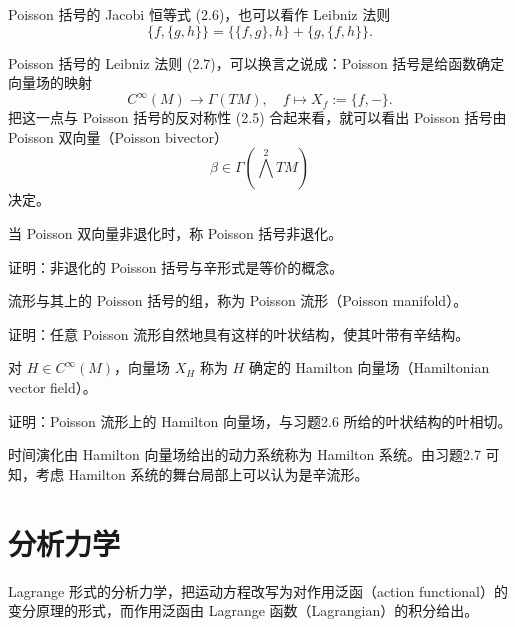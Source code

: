 \begin{remark}
Poisson 括号的 Jacobi 恒等式 (2.6)，也可以看作 Leibniz 法则
\begin{equation}
    \{f,\{g,h\}\}=\{\{f,g\},h\}+\{g,\{f,h\}\}. \tag{2.8}
\end{equation}
\end{remark}

Poisson 括号的 Leibniz 法则 (2.7)，可以换言之说成：Poisson 括号是给函数确定向量场的映射
\begin{equation}
    C^\infty(M)\to\Gamma(TM),\quad f\mapsto X_f:=\{f,-\}. \tag{2.9}
\end{equation}
把这一点与 Poisson 括号的反对称性 (2.5) 合起来看，就可以看出 Poisson 括号由 Poisson 双向量（Poisson bivector）
\begin{equation}
    \beta\in\Gamma\left(\bigwedge^2TM\right) \tag{2.10}
\end{equation}
决定。

\begin{definition}
当 Poisson 双向量非退化时，称 Poisson 括号非退化。
\end{definition}

\begin{exercise}
证明：非退化的 Poisson 括号与辛形式是等价的概念。
\end{exercise}

流形与其上的 Poisson 括号的组，称为 Poisson 流形（Poisson manifold）。

\begin{exercise}
证明：任意 Poisson 流形自然地具有这样的叶状结构，使其叶带有辛结构。
\end{exercise}

对 $H\in C^\infty(M)$，向量场 $X_H$ 称为 $H$ 确定的 Hamilton 向量场（Hamiltonian vector field）。

\begin{exercise}
证明：Poisson 流形上的 Hamilton 向量场，与习题2.6 所给的叶状结构的叶相切。
\end{exercise}

时间演化由 Hamilton 向量场给出的动力系统称为 Hamilton 系统。由习题2.7 可知，考虑 Hamilton 系统的舞台局部上可以认为是辛流形。

\section{分析力学}

Lagrange 形式的分析力学，把运动方程改写为对作用泛函（action functional）的变分原理的形式，而作用泛函由 Lagrange 函数（Lagrangian）的积分给出。

